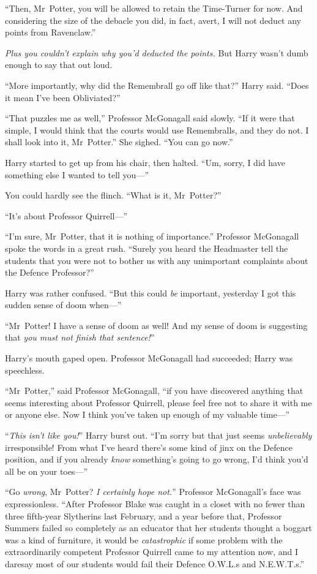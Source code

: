 “Then, Mr~Potter, you will be allowed to retain the Time-Turner for now. And considering the size of the debacle you did, in fact, avert, I will not deduct any points from Ravenclaw.”

\emph{Plus you couldn’t explain why you’d deducted the points.} But Harry wasn’t dumb enough to say that out loud.

“More importantly, why did the Remembrall go off like that?” Harry said. “Does it mean I’ve been Obliviated?”

“That puzzles me as well,” Professor McGonagall said slowly. “If it were that simple, I would think that the courts would use Remembralls, and they do not. I shall look into it, Mr~Potter.” She sighed. “You can go now.”

Harry started to get up from his chair, then halted. “Um, sorry, I did have something else I wanted to tell you—”

You could hardly see the flinch. “What is it, Mr~Potter?”

“It’s about Professor Quirrell—”

“I’m sure, Mr~Potter, that it is nothing of importance.” Professor McGonagall spoke the words in a great rush. “Surely you heard the Headmaster tell the students that you were not to bother us with any unimportant complaints about the Defence Professor?”

Harry was rather confused. “But this could \emph{be} important, yesterday I got this sudden sense of doom when—”

“Mr~Potter! I have a sense of doom as well! And my sense of doom is suggesting that \emph{you must not finish that sentence!}”

Harry’s mouth gaped open. Professor McGonagall had succeeded; Harry was speechless.

“Mr~Potter,” said Professor McGonagall, “if you have discovered anything that seems interesting about Professor Quirrell, please feel free not to share it with me or anyone else. Now I think you’ve taken up enough of my valuable time—”

“\emph{This isn’t like you!}” Harry burst out. “I’m sorry but that just seems \emph{unbelievably} irresponsible! From what I’ve heard there’s some kind of jinx on the Defence position, and if you already \emph{know} something’s going to go wrong, I’d think you’d all be on your toes—”

“Go \emph{wrong}, Mr~Potter? \emph{I certainly hope not.}” Professor McGonagall’s face was expressionless. “After Professor Blake was caught in a closet with no fewer than three fifth-year Slytherins last February, and a year before that, Professor Summers failed so completely as an educator that her students thought a boggart was a kind of furniture, it would be \emph{catastrophic} if some problem with the extraordinarily competent Professor Quirrell came to my attention now, and I daresay most of our students would fail their Defence O.W.L.s and N.E.W.T.s.”


